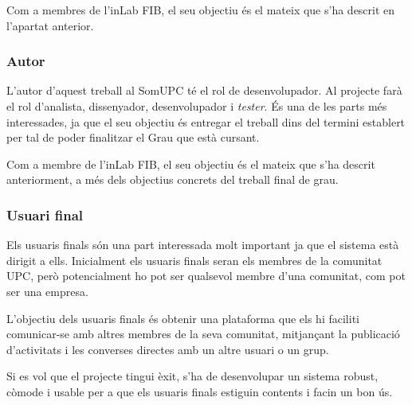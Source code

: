 Com a membres de l'inLab FIB, el seu objectiu és el mateix que s'ha descrit en l'apartat anterior.

\subsubsection{Autor}
L'autor d'aquest treball al SomUPC té el rol de desenvolupador. Al projecte farà el rol d'analista, dissenyador, desenvolupador i \textit{tester}. És una de les parts més interessades, ja que el seu objectiu és entregar el treball dins del termini establert per tal de poder finalitzar el Grau que està cursant.

Com a membre de l'inLab FIB, el seu objectiu és el mateix que s'ha descrit anteriorment, a més dels objectius concrets del treball final de grau.


\subsubsection{Usuari final}
Els usuaris finals són una part interessada molt important ja que el sistema està dirigit a ells. Inicialment els usuaris finals seran els membres de la comunitat UPC, però potencialment ho pot ser qualsevol membre d'una comunitat, com pot ser una empresa.

L'objectiu dels usuaris finals és obtenir una plataforma que els hi faciliti comunicar-se amb altres membres de la seva comunitat, mitjançant la publicació d'activitats i les converses directes amb un altre usuari o un grup.

Si es vol que el projecte tingui èxit, s'ha de desenvolupar un sistema robust, còmode i usable per a que els usuaris finals estiguin contents i facin un bon ús.


